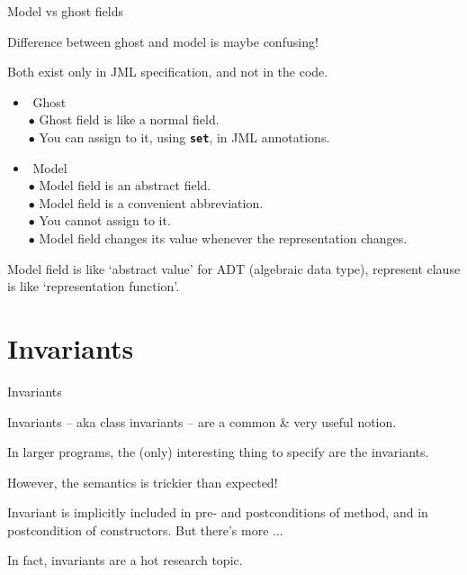 \documentclass[
pdf,
nocolorBG,
slideColor,
erik,
]{prosper}
\newcommand{\code}[1]{{\rm \texttt{\textbf{\small #1}}}}
\begin{document}
\begin{slide}{Model vs ghost fields}
\vspace*{-3ex}


Difference between {\green ghost} and {\blue model} is maybe confusing!

Both exist only in JML specification, and not in the code.

\begin{itemize}
\item$\!$ {\green Ghost}\\
$\bullet$ Ghost field is like a normal field. \\
$\bullet$ You can assign to it, using \code{set}, in JML annotations.
\item$\!$ {\blue Model}\\
$\bullet$ Model field is an abstract field.\\
$\bullet$ Model field is a convenient abbreviation.\\
$\bullet$ You cannot assign to it.\\
$\bullet$ Model field changes
its value whenever the representation changes.
\end{itemize}

{\scriptsize Model field is like `abstract value' for ADT (algebraic data type),
represent clause is like `representation function'.}

\end{slide}


\part{{\Large \red Invariants}}

\begin{slide}{Invariants}
\vspace*{-3ex}

Invariants -- aka class invariants -- are a common \& very useful notion.

\medskip

In larger programs, the (only) interesting thing to specify are the invariants.

\medskip

However, the semantics is trickier than expected!

\medskip

Invariant is implicitly included in pre- and postconditions
of method, and in postcondition of constructors.
But there's more ...

\medskip

In fact, invariants are a hot research topic.

\end{slide}
\end{document}
